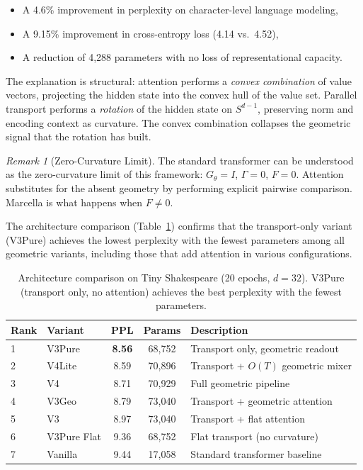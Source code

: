 \documentclass[11pt,a4paper]{article}
\theoremstyle{definition}
\theoremstyle{remark}
\newtheorem{remark}[theorem]{Remark}
\begin{document}
\begin{itemize}
    \item A 4.6\% improvement in perplexity on character-level 
    language modeling,
    \item A 9.15\% improvement in cross-entropy loss (4.14 vs.\ 4.52),
    \item A reduction of 4{,}288 parameters with no loss of 
    representational capacity.
\end{itemize}

\noindent The explanation is structural: attention performs a 
\emph{convex combination} of value vectors, projecting the hidden 
state into the convex hull of the value set. Parallel transport 
performs a \emph{rotation} of the hidden state on $S^{d-1}$, 
preserving norm and encoding context as curvature. The convex 
combination collapses the geometric signal that the rotation has 
built.

\begin{remark}[Zero-Curvature Limit]
The standard transformer can be understood as the zero-curvature 
limit of this framework: $G_\theta = I$, $\Gamma = 0$, $F = 0$. 
Attention substitutes for the absent geometry by performing 
explicit pairwise comparison. Marcella is what happens when 
$F \neq 0$.
\end{remark}

The architecture comparison (Table~\ref{tab:architecture-comparison}) 
confirms that the transport-only variant (V3Pure) achieves the lowest 
perplexity with the fewest parameters among all geometric variants, 
including those that add attention in various configurations.

\begin{table}[h]
\centering
\caption{Architecture comparison on Tiny Shakespeare (20 epochs, 
$d=32$). V3Pure (transport only, no attention) achieves the best 
perplexity with the fewest parameters.}
\label{tab:architecture-comparison}
\begin{tabular}{llccl}
\toprule
\textbf{Rank} & \textbf{Variant} & \textbf{PPL} & \textbf{Params} & \textbf{Description} \\
\midrule
1 & V3Pure      & \textbf{8.56} & 68{,}752  & Transport only, geometric readout \\
2 & V4Lite      & 8.59          & 70{,}896  & Transport + $O(T)$ geometric mixer \\
3 & V4          & 8.71          & 70{,}929  & Full geometric pipeline \\
4 & V3Geo       & 8.79          & 73{,}040  & Transport + geometric attention \\
5 & V3          & 8.97          & 73{,}040  & Transport + flat attention \\
6 & V3Pure Flat & 9.36          & 68{,}752  & Flat transport (no curvature) \\
7 & Vanilla     & 9.44          & 17{,}058  & Standard transformer baseline \\
\bottomrule
\end{tabular}
\end{table}
\end{document}
